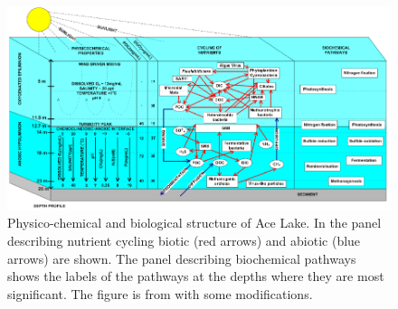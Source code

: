 \begin{figure}
\centering
\includegraphics[width=\textwidth]{ace_figures/ace_diagram.pdf}
\caption[Physico-chemical and biological structure of Ace Lake from \citet{Lauro2011}]{Physico-chemical and biological structure of Ace Lake.
In the panel describing nutrient cycling biotic (red arrows) and abiotic (blue arrows) are shown.
The panel describing biochemical pathways shows the labels of the pathways at the depths where they are most significant.
The figure is from \citet{Lauro2011} with some modifications.
}
\label{fig:ace_diagram}

\end{figure}
